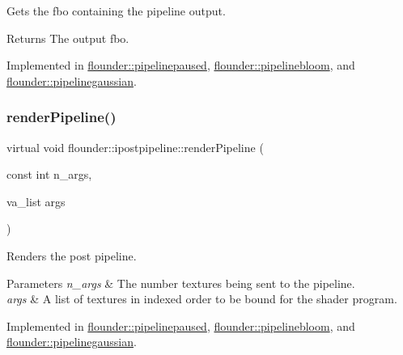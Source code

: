 Gets the fbo containing the pipeline output. 

\begin{DoxyReturn}{Returns}
The output fbo. 
\end{DoxyReturn}


Implemented in \hyperlink{classflounder_1_1pipelinepaused_a7824b6364878b5aaf57921e2a7a4915a}{flounder\+::pipelinepaused}, \hyperlink{classflounder_1_1pipelinebloom_a0ab1108f9115014014f7a8bd5ca5ac34}{flounder\+::pipelinebloom}, and \hyperlink{classflounder_1_1pipelinegaussian_aae27c8214a8a544b1ab96ddd2383a2b2}{flounder\+::pipelinegaussian}.

\mbox{\label{classflounder_1_1ipostpipeline_a25255482fdb75f92b8c3f940ca8c583a}} 
\subsubsection{\texorpdfstring{render\+Pipeline()}{renderPipeline()}}
{\footnotesize\ttfamily virtual void flounder\+::ipostpipeline\+::render\+Pipeline (\begin{DoxyParamCaption}\item[{const int}]{n\+\_\+args,  }\item[{va\+\_\+list}]{args }\end{DoxyParamCaption})\hspace{0.3cm}{\ttfamily [pure virtual]}}



Renders the post pipeline. 


\begin{DoxyParams}{Parameters}
{\em n\+\_\+args} & The number textures being sent to the pipeline. \\
\hline
{\em args} & A list of textures in indexed order to be bound for the shader program. \\
\hline
\end{DoxyParams}


Implemented in \hyperlink{classflounder_1_1pipelinepaused_ad524695829a716d4726118c2e6ac43a1}{flounder\+::pipelinepaused}, \hyperlink{classflounder_1_1pipelinebloom_a6ef1ad3bceb0239ed08148cdbce477e2}{flounder\+::pipelinebloom}, and \hyperlink{classflounder_1_1pipelinegaussian_ab5416e0179e9b6175c8e59c07300d253}{flounder\+::pipelinegaussian}.

